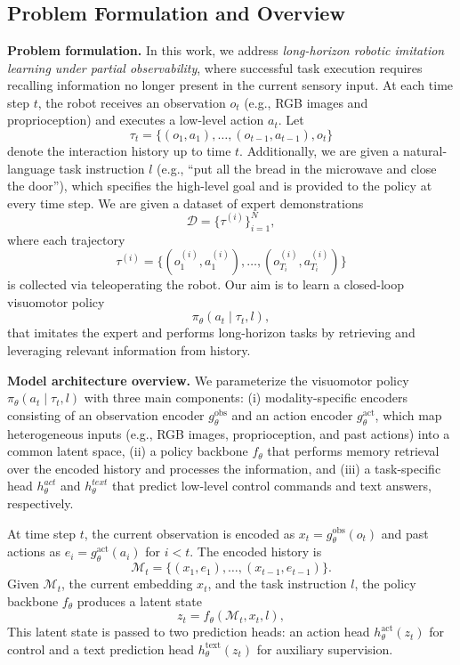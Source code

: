 \section{\ourmethod{}}
\subsection{Problem Formulation and Overview}
\noindent
\textbf{Problem formulation.}
In this work, we address \emph{long-horizon robotic imitation learning under partial observability}, where successful task execution requires recalling information no longer present in the current sensory input.
At each time step $t$, the robot receives an observation $o_t$ (e.g., RGB images and proprioception) and executes a low-level action $a_t$.
Let
\[
\tau_t = \{(o_1, a_1), \ldots, (o_{t-1}, a_{t-1}), o_t\}
\]
denote the interaction history up to time $t$.
Additionally, we are given a natural-language task instruction $l$ (e.g., ``put all the bread in the microwave and close the door''), which specifies the high-level goal and is provided to the policy at every time step.
We are given a dataset of expert demonstrations
\[
\mathcal{D} = \{\tau^{(i)}\}_{i=1}^N,
\]
where each trajectory
\[
\tau^{(i)} = \{(o^{(i)}_1, a^{(i)}_1), \ldots, (o^{(i)}_{T_i}, a^{(i)}_{T_i})\}
\]
is collected via teleoperating the robot.
Our aim is to learn a closed-loop visuomotor policy
\[
\pi_\theta(a_t \mid \tau_t, l),
\]
that imitates the expert and performs long-horizon tasks by retrieving and leveraging relevant information from history.

\vspace{0.5em}
\noindent
\textbf{Model architecture overview.}
We parameterize the visuomotor policy $\pi_\theta(a_t \mid \tau_t, l)$ with three main components: 
(i) modality-specific encoders consisting of an observation encoder $g_\theta^{\text{obs}}$ and an action encoder $g_\theta^{\text{act}}$, which map heterogeneous inputs (e.g., RGB images, proprioception, and past actions) into a common latent space,
(ii) a policy backbone $f_\theta$ that performs memory retrieval over the encoded history and processes the information, and
(iii) a task-specific head $h_\theta^{act}$ and $h_\theta^{text}$ that predict low-level control commands and text answers, respectively.

At time step $t$, the current observation is encoded as $x_t = g_\theta^{\text{obs}}(o_t)$ and past actions as $e_i = g_\theta^{\text{act}}(a_i)$ for $i < t$.
The encoded history is
\[
\mathcal{M}_t = \{(x_1, e_1), \ldots, (x_{t-1}, e_{t-1})\}.
\]
Given $\mathcal{M}_t$, the current embedding $x_t$, and the task instruction $l$, the policy backbone $f_\theta$ produces a latent state
\[
z_t = f_\theta(\mathcal{M}_t, x_t, l),
\]
This latent state is passed to two prediction heads: an action head $h_\theta^{\text{act}}(z_t)$ for control and a text prediction head $h_\theta^{\text{text}}(z_t)$ for auxiliary supervision.

